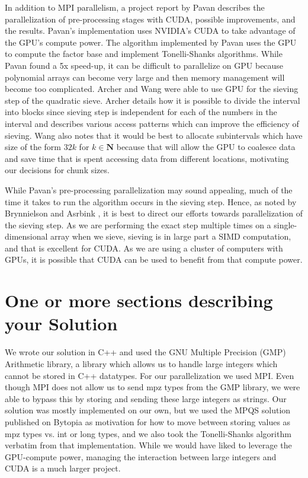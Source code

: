\documentclass[11pt,twocolumn]{article}
\begin{document}
\indent In addition to MPI parallelism, a project report by Pavan \cite{pavan:parallelgpu} describes the parallelization of pre-processing stages with CUDA, possible improvements, and the results. Pavan's implementation uses NVIDIA's CUDA to take advantage of the GPU's compute power. The algorithm implemented by Pavan uses the GPU to compute the factor base and implement Tonelli-Shanks algorithms. While Pavan found a 5x speed-up, it can be difficult to parallelize on GPU because polynomial arrays can become very large and then memory management will become too complicated. Archer and Wang \cite{archer:qsgpu} \cite{wang:qsgpu} were able to use GPU for the sieving step of the quadratic sieve. Archer details how it is possible to divide the interval into blocks since sieving step is independent for each of the numbers in the interval and describes various access patterns which can improve the efficiency of sieving. Wang also notes that it would be best to allocate subintervals which have size of the form $32k$ for $k \in \mathbf{N}$ because that will allow the GPU to coalesce data and save time that is spent accessing data from different locations, motivating our decisions for chunk sizes.

\indent While Pavan's pre-processing parallelization may sound appealing, much of the time it takes to run the algorithm occurs in the sieving step. Hence, as noted by Brynnielson and Asrbink \cite{asbrink:parallelqs}, it is best to direct our efforts towards parallelization of the sieving step. As we are performing the exact step multiple times on a single-dimensional array when we sieve, sieving is in large part a SIMD computation, and that is excellent for CUDA. As we are using a cluster of computers with GPUs, it is possible that CUDA can be used to benefit from that compute power.

\section {One or more sections describing your Solution}\label{soln}
We wrote our solution in C++ and used the GNU Multiple Precision (GMP) Arithmetic library, a library which allows us to handle large integers which cannot be stored in C++ datatypes. For our parallelization we used MPI. Even though MPI does not allow us to send mpz types from the GMP library, we were able to bypass this by storing and sending these large integers as strings. Our solution was mostly implemented on our own, but we used the MPQS solution published on Bytopia \cite{bytopia:help} as motivation for how to move between storing values as mpz types vs. int or long types, and we also took the Tonelli-Shanks algorithm verbatim from that implementation. While we would have liked to leverage the GPU-compute power, managing the interaction between large integers and CUDA is a much larger project.
\end{document}

